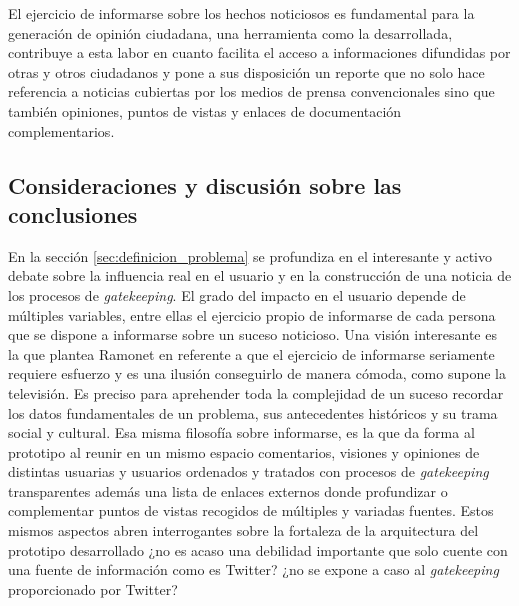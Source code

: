 El ejercicio de informarse sobre los hechos noticiosos es fundamental para la generación de opinión ciudadana, una herramienta como la desarrollada, contribuye a esta labor en cuanto facilita el acceso a informaciones difundidas por otras y otros ciudadanos y pone a sus disposición un reporte que no solo hace referencia a noticias cubiertas por los medios de prensa convencionales sino que también opiniones, puntos de vistas y enlaces de documentación complementarios. 




\subsection{Consideraciones y discusión sobre las conclusiones}

En la sección \ref{sec:definicion_problema} se profundiza en el interesante y activo debate sobre la influencia real en el usuario y en la construcción de una noticia de los procesos de \emph{gatekeeping}. El grado del impacto en el usuario depende de múltiples variables, entre ellas el ejercicio propio de informarse de cada persona que se dispone a informarse sobre un suceso noticioso. Una visión interesante es la que plantea Ramonet en \cite{fatigaInformarse} referente a que el ejercicio de informarse seriamente requiere esfuerzo y es una ilusión conseguirlo de manera cómoda, como supone la televisión. Es preciso para aprehender toda la complejidad de un suceso recordar los datos fundamentales de un problema, sus antecedentes históricos y su trama social y cultural. Esa misma filosofía sobre informarse, es la que da forma al prototipo al reunir en un mismo espacio comentarios, visiones y opiniones de distintas usuarias y usuarios ordenados y tratados con procesos de \emph{gatekeeping} transparentes además una lista de enlaces externos donde profundizar o complementar puntos de vistas recogidos de múltiples y variadas fuentes. Estos mismos aspectos abren interrogantes sobre la fortaleza de la arquitectura del prototipo desarrollado ¿no es acaso una debilidad importante que solo cuente con una fuente de información como es Twitter? ¿no se expone a caso al \emph{gatekeeping} proporcionado por Twitter?

